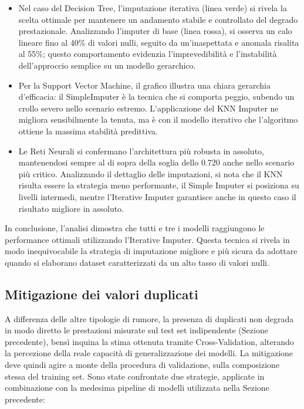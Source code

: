 \documentclass[12pt]{article}
\begin{document}
\begin{itemize}
    \item Nel caso del Decision Tree, l'imputazione iterativa (linea verde) si rivela la scelta ottimale per mantenere un andamento stabile e controllato del degrado prestazionale. Analizzando l'imputer di base (linea rossa), si osserva un calo lineare fino al 40\% di valori nulli, seguito da un'inaspettata e anomala risalita al 55\%; questo comportamento evidenzia l'imprevedibilità e l'instabilità dell'approccio semplice su un modello gerarchico.
    
    \item Per la Support Vector Machine, il grafico illustra una chiara gerarchia d'efficacia: il SimpleImputer è la tecnica che si comporta peggio, subendo un crollo severo nello scenario estremo. L'applicazione del KNN Imputer ne migliora sensibilmente la tenuta, ma è con il modello iterativo che l'algoritmo ottiene la massima stabilità predittiva.
    
    \item Le Reti Neurali si confermano l'architettura più robusta in assoluto, mantenendosi sempre al di sopra della soglia dello 0.720 anche nello scenario più critico. Analizzando il dettaglio delle imputazioni, si nota che il KNN risulta essere la strategia meno performante, il Simple Imputer si posiziona su livelli intermedi, mentre l'Iterative Imputer garantisce anche in questo caso il risultato migliore in assoluto.
\end{itemize}

In conclusione, l'analisi dimostra che tutti e tre i modelli raggiungono le performance ottimali utilizzando l'Iterative Imputer. Questa tecnica si rivela in modo inequivocabile la strategia di imputazione migliore e più sicura da adottare quando si elaborano dataset caratterizzati da un alto tasso di valori nulli.



\subsection{Mitigazione dei valori duplicati}
\label{sec:dedup}

A differenza delle altre tipologie di rumore, la presenza di duplicati non degrada in modo diretto le prestazioni misurate sul test set indipendente (Sezione precedente), bensì inquina la stima ottenuta tramite Cross-Validation, alterando la percezione della reale capacità di generalizzazione dei modelli. La mitigazione deve quindi agire a monte della procedura di validazione, sulla composizione stessa del training set. Sono state confrontate due strategie, applicate in combinazione con la medesima pipeline di modelli utilizzata nella Sezione precedente:
\end{document}
